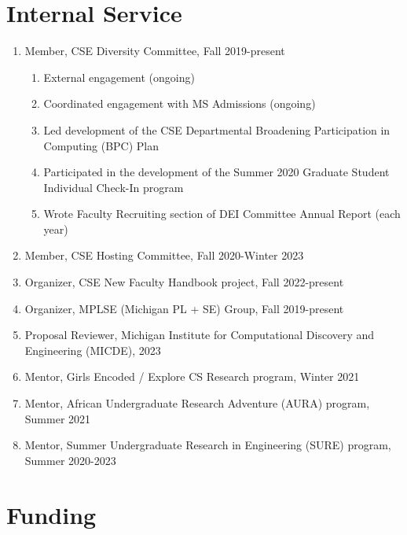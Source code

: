 \documentclass[10pt,letterpaper]{article}
\begin{document}
\section*{Internal Service}
\begin{enumerate}
  \item Member, CSE Diversity Committee, Fall 2019-present
        \begin{enumerate}
          \item External engagement (ongoing)
          \item Coordinated engagement with MS Admissions (ongoing)
          \item Led development of the CSE Departmental Broadening Participation in Computing (BPC) Plan
          \item Participated in the development of the Summer 2020 Graduate Student Individual Check-In program
          \item Wrote Faculty Recruiting section of DEI Committee Annual Report (each year)
        \end{enumerate}
  \item Member, CSE Hosting Committee, Fall 2020-Winter 2023
  \item Organizer, CSE New Faculty Handbook project, Fall 2022-present
  \item Organizer, MPLSE (Michigan PL + SE) Group, Fall 2019-present
  \item Proposal Reviewer, Michigan Institute for Computational Discovery and Engineering (MICDE), 2023
  \item Mentor, Girls Encoded / Explore CS Research program, Winter 2021
  \item Mentor, African Undergraduate Research Adventure (AURA) program, Summer 2021
  \item Mentor, Summer Undergraduate Research in Engineering (SURE) program, Summer 2020-2023
\end{enumerate}


\section*{Funding}
\end{document}
